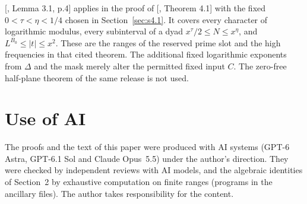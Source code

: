 \documentclass[11pt]{article}
\theoremstyle{definition}
\theoremstyle{definition}
\begin{document}
[, Lemma 3.1, p.4] applies in the proof of [, Theorem 4.1] with the fixed \(0<\tau<\eta<1/4\) chosen in Section~\ref{sec:s4.1}. It covers every character of logarithmic modulus, every subinterval of a dyad \(x^\tau/2\le N\le x^\eta\), and \(L^{B_0}\le|t|\le x^2\). These are the ranges of the reserved prime slot and the high frequencies in that cited theorem. The additional fixed logarithmic exponents from \(\Delta\) and the mask merely alter the permitted fixed input \(C\). The zero-free half-plane theorem of the same release is not used.



\section*{Use of AI}
The proofs and the text of this paper were produced with AI systems (GPT-6 Astra, GPT-6.1 Sol and Claude Opus~5.5) under the author's direction. They were checked by independent reviews with AI models, and the algebraic identities of Section~2 by exhaustive computation on finite ranges (programs in the ancillary files). The author takes responsibility for the content.
\end{document}
